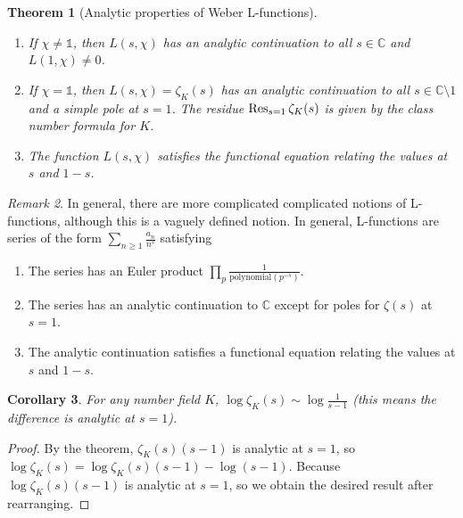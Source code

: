 \documentclass[leqno, openany]{memoir}
\newtheorem{thm}{Theorem}[section]
\newtheorem{cor}[thm]{Corollary}
\theoremstyle{definition}
\theoremstyle{remark}
\newtheorem{rmk}[thm]{Remark}
\theoremstyle{plain}
\theoremstyle{definition}
\theoremstyle{remark}
\newcommand{\C}{\mathbb{C}}
\begin{document}
\begin{thm}[Analytic properties of Weber L-functions]\leavevmode
    \begin{enumerate} \item If $\chi \neq \mathbb{1}$, then $L(s, \chi)$ has an
        analytic continuation to all $s \in \C$ and $L(1, \chi) \neq 0$.  \item
        If $\chi = \mathbb{1}$, then $L(s, \chi) = \zeta_K(s)$ has an analytic
        continuation to all $s \in \C \setminus \qty{1}$ and a simple pole at
        $s = 1$. The residue $\Res_{s=1} \zeta_K(s)$ is given by the class
        number formula for $K$.  \item The function $L(s,\chi)$ satisfies the
functional equation relating the values at $s$ and $1-s$.  \end{enumerate}
\end{thm}

\begin{rmk} In general, there are more complicated complicated notions of
    L-functions, although this is a vaguely defined notion. In general,
    L-functions are series of the form $\sum_{n \geq 1} \frac{a_n}{n^s}$
    satisfying \begin{enumerate} \item The series has an Euler product $\prod_p
        \frac{1}{\text{polynomial}(p^{-s})}$.  \item The series has an analytic
        continuation to $\C$ except for poles for $\zeta(s)$ at $s = 1$.  \item
        The analytic continuation satisfies a functional equation relating the
        values at $s$ and $1-s$.  \end{enumerate} \end{rmk}

\begin{cor} For any number field $K$, $\log \zeta_K(s) \sim \log \frac{1}{s-1}$
(this means the difference is analytic at $s=1$).  \end{cor}

\begin{proof} By the theorem, $\zeta_K(s) (s-1)$ is analytic at $s=1$, so $\log
\zeta_K(s) = \log \zeta_K(s)(s-1) - \log (s-1)$. Because $\log \zeta_K(s)(s-1)$
is analytic at $s=1$, so we obtain the desired result after rearranging.
\end{proof}
\end{document}
